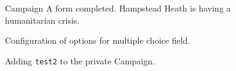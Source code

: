 \documentclass{article}
\begin{document}
		\begin{figure}[H]
			\centering
			\caption{Campaign A form completed. Hampstead Heath is having a humanitarian crisis.}
			\label{fig:eval-ca-3}
		\end{figure}

		\begin{figure}[H]
			\centering
			\caption{Configuration of options for multiple choice field.}
			\label{fig:eval-ca-5}
		\end{figure}


		\begin{figure}[H]
			\centering
			\caption{Adding \texttt{test2} to the private Campaign.}
			\label{fig:eval-ca-6}
		\end{figure}
\end{document}
